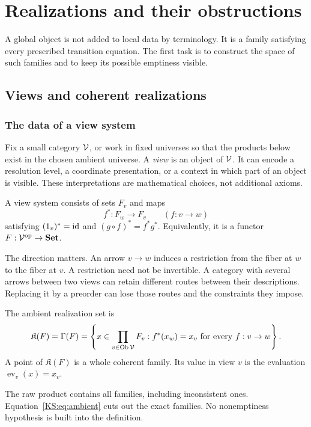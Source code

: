 

\chapter{Realizations and their obstructions}\label{KS:book:chapter-19}
A global object is not added to local data by terminology. It is a family satisfying every prescribed transition equation. The first task is to construct the space of such families and to keep its possible emptiness visible.

\section{Views and coherent realizations}\label{KS:sec:views}
\subsection{The data of a view system}
Fix a small category \(\mathcal V\), or work in fixed universes so that the products below exist in the chosen ambient universe. A \emph{view} is an object of \(\mathcal V\). It can encode a resolution level, a coordinate presentation, or a context in which part of an object is visible. These interpretations are mathematical choices, not additional axioms.

\begin{KSdefinition}
A view system consists of sets \(F_v\) and maps
\[
 f^*:F_w\longrightarrow F_v\qquad(f:v\longrightarrow w)
\]
satisfying \((1_v)^*=\operatorname{id}\) and \((g\circ f)^*=f^*g^*\). Equivalently, it is a functor \(F:\mathcal V^{\mathrm{op}}\to\mathbf{Set}\).
\end{KSdefinition}
The direction matters. An arrow \(v\to w\) induces a restriction from the fiber at \(w\) to the fiber at \(v\). A restriction need not be invertible. A category with several arrows between two views can retain different routes between their descriptions. Replacing it by a preorder can lose those routes and the constraints they impose.

\begin{KSdefinition}
The ambient realization set is
\begin{equation}\label{KS:eq:ambient}
 \mathfrak K(F)=\Gamma(F)=
 \left\{x\in\prod_{v\in\operatorname{Ob}\mathcal V}F_v:
 f^*(x_w)=x_v\text{ for every }f:v\to w\right\}.
\end{equation}
A point of \(\mathfrak K(F)\) is a whole coherent family. Its value in view \(v\) is the evaluation \(\operatorname{ev}_v(x)=x_v\).
\end{KSdefinition}
The raw product contains all families, including inconsistent ones. Equation~\eqref{KS:eq:ambient} cuts out the exact families. No nonemptiness hypothesis is built into the definition.

